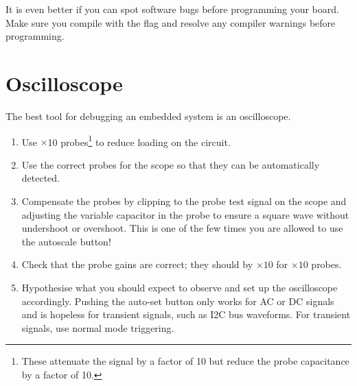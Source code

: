 It is even better if you can spot software bugs before programming
your board. Make sure you compile with the  flag and
resolve any compiler warnings before programming.

\section{Oscilloscope}
\label{oscilloscope}

The best tool for debugging an embedded system is an oscilloscope.

\begin{enumerate}
\item Use $\times$10 probes\footnote{These attenuate the signal by a
  factor of 10 but reduce the probe capacitance by a factor of 10.} to
  reduce loading on the circuit.

\item Use the correct probes for the scope so that they can be
  automatically detected.

\item Compensate the probes by clipping to the probe test signal on
  the scope and adjusting the variable capacitor in the probe to
  ensure a square wave without undershoot or overshoot. This is one of
  the few times you are allowed to use the autoscale button!

\item Check that the probe gains are correct; they should by $\times
  10$ for $\times 10$ probes.

\item Hypothesise what you should expect to observe and set up the
  oscilloscope accordingly.  Pushing the auto-set button only works
  for AC or DC signals and is hopeless for transient signals, such as
  I2C bus waveforms.  For transient signals, use normal mode triggering.

\end{enumerate}

